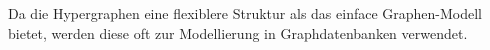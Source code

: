 Da die Hypergraphen eine flexiblere Struktur als das einface Graphen-Modell bietet, werden diese oft zur Modellierung in Graphdatenbanken verwendet.\cite{flockdb}
